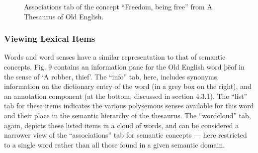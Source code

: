\begin{figure}[htbp]
	\caption[]{\label{fig:Stolk2021a:Fig8} Associations tab of the concept “Freedom, being free” from A Thesaurus of Old English.}
\end{figure}


\subsubsection{Viewing Lexical Items}
Words and word senses have a similar representation to that of semantic concepts. Fig. 9 contains an information pane for the Old English word þēof in the sense of ‘A robber, thief’. The “info” tab, here, includes synonyms, information on the dictionary entry of the word (in a grey box on the right), and an annotation component (at the bottom, discussed in section 4.3.1). The “list” tab for these items indicates the various polysemous senses available for this word and their place in the semantic hierarchy of the thesaurus. The “wordcloud” tab, again, depicts these listed items in a cloud of words, and can be considered a narrower view of the “associations” tab for semantic concepts — here restricted to a single word rather than all those found in a given semantic domain.

